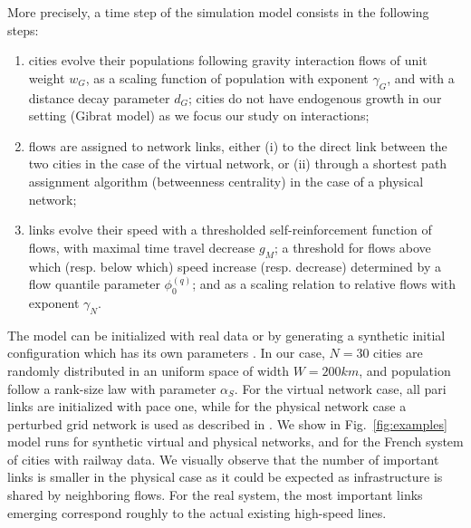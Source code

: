 \documentclass[11pt]{article}
\begin{document}
More precisely, a time step of the simulation model consists in the following steps:
\begin{enumerate}
	\item cities evolve their populations following gravity interaction flows of unit weight $w_G$, as a scaling function of population with exponent $\gamma_G$, and with a distance decay parameter $d_G$; cities do not have endogenous growth in our setting (Gibrat model) as we focus our study on interactions;
	\item flows are assigned to network links, either (i) to the direct link between the two cities in the case of the virtual network, or (ii) through a shortest path assignment algorithm (betweenness centrality) in the case of a physical network;
	\item links evolve their speed with a thresholded self-reinforcement function of flows, with maximal time travel decrease $g_M$; a threshold for flows above which (resp. below which) speed increase (resp. decrease) determined by a flow quantile parameter $\phi^{(q)}_0$; and as a scaling relation to relative flows with exponent $\gamma_N$.
\end{enumerate}

The model can be initialized with real data or by generating a synthetic initial configuration which has its own parameters \citep{raimbault2019space}. In our case, $N = 30$ cities are randomly distributed in an uniform space of width $W=200km$, and population follow a rank-size law with parameter $\alpha_S$. For the virtual network case, all pari links are initialized with pace one, while for the physical network case a perturbed grid network is used as described in \cite{raimbault2018modeling}. We show in Fig.~\ref{fig:examples} model runs for synthetic virtual and physical networks, and for the French system of cities with railway data. We visually observe that the number of important links is smaller in the physical case as it could be expected as infrastructure is shared by neighboring flows. For the real system, the most important links emerging correspond roughly to the actual existing high-speed lines.
\end{document}
